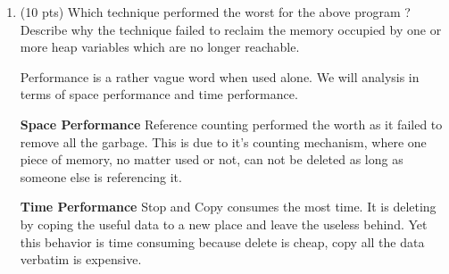 \documentclass[10pt]{article}
\begin{document}
\begin{enumerate}
\begin{enumerate}
  \item (10 pts) Which technique performed the worst for the above program ? Describe why the technique failed to reclaim the memory occupied by one or more heap variables which are no longer reachable.

\par
Performance is a rather vague word when used alone. We will analysis in terms of space performance and time performance.
\par
\textbf{Space Performance} Reference counting performed the worth as it failed to remove all the garbage. This is due to it's counting mechanism, where one piece of memory, no matter used or not, can not be deleted as long as someone else is referencing it.

\textbf{Time Performance} Stop and Copy consumes the most time. It is deleting by coping the useful data to a new place and leave the useless behind. Yet this behavior is time consuming because delete is cheap, copy all the data verbatim is expensive.
\end{enumerate}
\end{enumerate}
\end{document}
